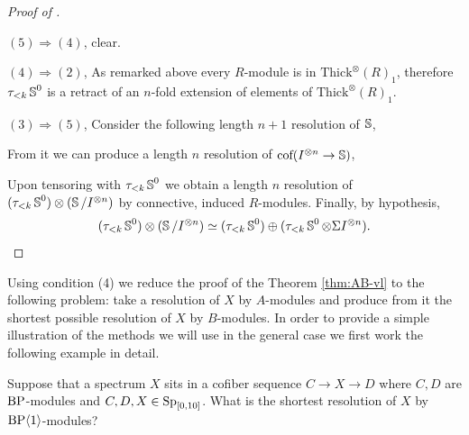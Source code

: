 \begin{proof}[Proof of ]\
  
  $(5) \Rightarrow (4)$, clear.
  
  $(4) \Rightarrow (2)$,
  As remarked above every $R$-module is in $\text{Thick}^{\otimes}(R)_1$, therefore $\tau_{<k}\operatorname{\mathbb{S}}^0$ is a retract of an $n$-fold extension of elements of $\text{Thick}^{\otimes}(R)_1$.
  
  $(3) \Rightarrow (5)$,
  Consider the following length $n+1$ resolution of $\operatorname{\mathbb{S}}$,
  \begin{center}
  \end{center}
  From it we can produce a length $n$ resolution of $\text{cof}(I^{\otimes n} \to \operatorname{\mathbb{S}})$,
  \begin{center}
  \end{center}
  Upon tensoring with $\tau_{<k}\operatorname{\mathbb{S}}^0$ we obtain a length $n$ resolution of $(\tau_{<k}\operatorname{\mathbb{S}}^0) \otimes (\operatorname{\mathbb{S}}/I^{\otimes n})$ by connective, induced $R$-modules. Finally, by hypothesis,
  $$ (\tau_{<k}\operatorname{\mathbb{S}}^0) \otimes (\operatorname{\mathbb{S}}/I^{\otimes n}) \simeq (\tau_{<k}\operatorname{\mathbb{S}}^0) \oplus (\tau_{<k}\operatorname{\mathbb{S}}^0 \otimes \Sigma I^{\otimes n}). $$
\end{proof}

Using condition (4) we reduce the proof of the Theorem \ref{thm:AB-vl} to the following problem:
take a resolution of $X$ by $A$-modules and produce from it the shortest possible resolution of $X$ by $B$-modules. In order to provide a simple illustration of the methods we will use in the general case we first work the following example in detail.

\begin{qst*} Suppose that a spectrum $X$ sits in a cofiber sequence $C \to X \to D$ where $C,D$ are $\textup{BP}$-modules and $C,D,X \in \operatorname{\mathrm{Sp}}_{[0,10]}$. What is the shortest resolution of $X$ by $\textup{BP}\langle 1 \rangle$-modules?
\end{qst*}


